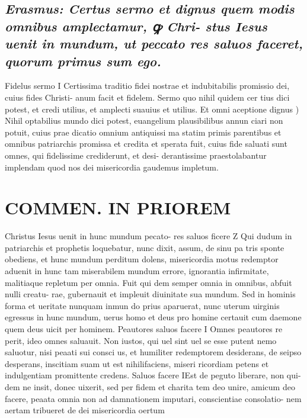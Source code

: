 \documentclass{article}
\begin{document}
\begin{pages}
\subsection*{\textit{Erasmus: Certus sermo et dignus quem modis omnibus amplectamur, ꝙ Chri- stus Iesus uenit in mundum, ut peccato res saluos faceret, quorum primus sum ego. }}\pstart Fidelus sermo I Certissima traditio fidei nostrae et indubitabilis promissio dei, cuius fides Christi- anum facit et fidelem. Sermo quo nihil quidem cer tius dici potest, et credi utilius, et amplecti suauius et utilius.  \pend\pstart Et omni aceptione dignus ) Nihil optabilius mundo dici potest, euangelium plausibilibus annun ciari non potuit, cuius prae dicatio omnium antiquissi ma statim primis parentibus et omnibus patriarchis promissa et credita et sperata fuit, cuius fide saluati sunt omnes, qui fidelissime crediderunt, et desi- derantissime praestolabantur implendam quod nos dei misericordia gaudemus impletum.  \pend
\section*{COMMEN. IN PRIOREM }
\marginpar{[ p.32 ]}\pstart Christus Iesus uenit in hunc mundum pecato- res saluos ficere Z Qui dudum in patriarchis et prophetis loquebatur, nunc dixit, assum, de sinu pa tris sponte obediens, et hunc mundum perditum dolens, misericordia motus redemptor aduenit in hunc tam miserabilem mundum errore, ignorantia infirmitate, malitiaque repletum per omnia. Fuit qui dem semper omnia in omnibus, abfuit nulli creatu- rae, gubernauit et impleuit diuinitate sua mundum. Sed in hominis forma et ueritate nunquam inmun do prius aparuerat, nunc uterum uirginis egressus in hunc mundum, uerus homo et deus pro homine certauit cum daemone quem deus uicit per hominem.  \pend\pstart Peautores saluos facere I Omnes peautores re perit, ideo omnes saluauit. Non iustos, qui uel sint uel se esse putent nemo saluotur, nisi peaati sui consci us, et humiliter redemptorem desiderans, de seipso desperans, inscitiam suam ut est nihilifaciens, miseri ricordiam petens et indulgentiam promittente credens.  \pend\pstart Saluos facere IEst de peguto liberare, non qui- dem ne insit, donec uixerit, sed per fidem et charita tem deo unire, amicum deo facere, peaata omnia non ad damnationem imputari, conscientiae consolatio- nem aertam tribueret de dei misericordia oertum  \pend

\end{pages}
\end{document}
